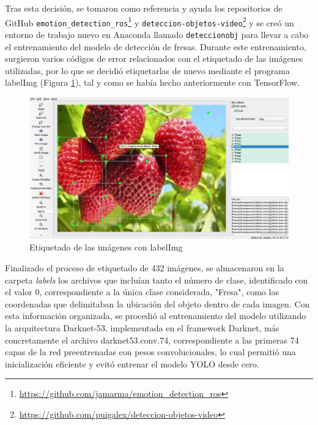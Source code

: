 Tras esta decisión, se tomaron como referencia y ayuda los repositorios de GitHub \verb|emotion_detection_ros|\footnote{\url{https://github.com/jamarma/emotion_detection_ros}} y \verb|deteccion-objetos-video|\footnote{\url{https://github.com/puigalex/deteccion-objetos-video}} y se creó un entorno de trabajo nuevo en Anaconda llamado \verb|deteccionobj| para llevar a cabo el entrenamiento del modelo de detección de fresas. Durante este entrenamiento, surgieron varios códigos de error relacionados con el etiquetado de las imágenes utilizadas, por lo que se decidió etiquetarlas de nuevo mediante el programa labelImg (Figura \ref{fig:labelImg_Fresas}), tal y como se había hecho anteriormente con TensorFlow.

 \begin{figure}[H]
     \centering
     \begin{center}
       \includegraphics[width=150mm]{figs/labelImg Fresa.png}
     \end{center}
     \caption{Etiquetado de las imágenes con labelImg}
    \label{fig:labelImg_Fresas}
  \end{figure}

Finalizado el proceso de etiquetado de 432 imágenes, se almacenaron en la carpeta \textit{labels} los archivos que incluían tanto el número de clase, identificado con el valor 0, correspondiente a la única clase considerada, "Fresa",  como las coordenadas que delimitaban la ubicación del objeto dentro de cada imagen. Con esta información organizada, se procedió al entrenamiento del modelo utilizando la arquitectura Darknet-53, implementada en el framework Darknet, más concretamente el archivo darknet53.conv.74, correspondiente a las primeras 74 capas de la red preentrenadas con pesos convolucionales, lo cual permitió una inicialización eficiente y evitó entrenar el modelo YOLO desde cero.

